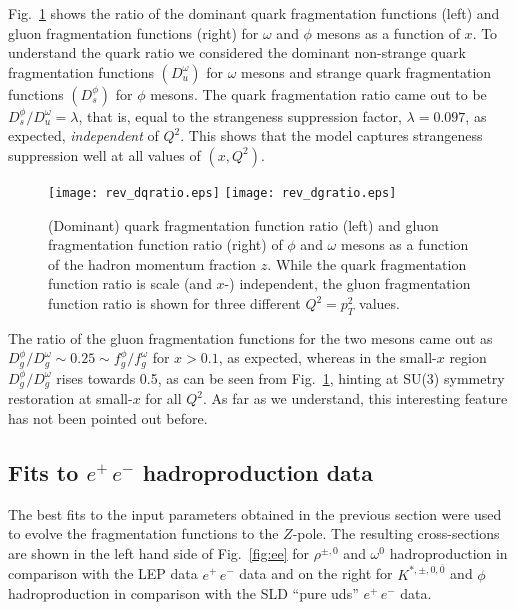 \documentclass{ws-ijmpa}
\begin{document}
Fig.~\ref{fig:dqgratio} shows the ratio of the dominant quark
fragmentation functions (left) and gluon fragmentation functions (right)
for $\omega$ and $\phi$ mesons as a function of $x$. To understand the
quark ratio we considered the dominant non-strange quark fragmentation
functions $(D_u^{\omega})$ for $\omega$ mesons and strange quark
fragmentation functions $(D_s^{\phi})$ for $\phi$ mesons.  The quark
fragmentation ratio came out to be $D_s^{\phi}/D_u^{\omega} = \lambda$,
that is, equal to the strangeness suppression factor, $\lambda = 0.097$,
as expected, {\em independent} of $Q^2$. This shows that the model
captures strangeness suppression well at all values of $(x, Q^2)$.
\begin{figure}[htp]
\texttt{[image: rev\_dqratio.eps]}
\texttt{[image: rev\_dgratio.eps]}
\vspace*{8pt}
\caption{(Dominant) quark fragmentation function ratio (left) and gluon
fragmentation function ratio (right) of $\phi$ and $\omega$ mesons
as a function of the hadron momentum fraction $z$. While the quark
fragmentation function ratio is scale (and $x$-) independent, the gluon
fragmentation function ratio is shown for three different $Q^2 = p_T^2$
values.}
\label{fig:dqgratio}
\end{figure}

The ratio of the gluon fragmentation functions for the two mesons came out
as $D_g^{\phi}/D_g^{\omega} \sim 0.25 \sim f_g^\phi/f_g^{\omega}$ for $x
> 0.1$,
as expected, whereas in the small-$x$ region $D_g^{\phi}/D_g^{\omega}$
rises towards
0.5, as can be seen from Fig.~\ref{fig:dqgratio}, hinting at SU(3)
symmetry restoration at small-$x$ for all $Q^2$. As far as we understand,
this interesting feature has not been pointed out before.

\subsection{Fits to $e^+\,e^-$ hadroproduction data}
\label{Datafits}
The best fits to the input parameters obtained in the previous
section were used to evolve the fragmentation functions to the
$Z$-pole. The resulting cross-sections are shown in the left hand side
of Fig.~\ref{fig:ee} for $\rho^{\pm, 0}$ and $\omega^0$ hadroproduction
in comparison with the LEP
data\cite{Data,Rho1,Rho2,Rho3,Rho5,Omega1,Omega2} $e^+\,e^-$ data
and on the right for $K^{*,\pm,0,\overline{0}}$ and $\phi$ hadroproduction
in comparison with the SLD ``pure uds''\cite{SLD1,SLD2} $e^+\,e^-$ data.
\end{document}
